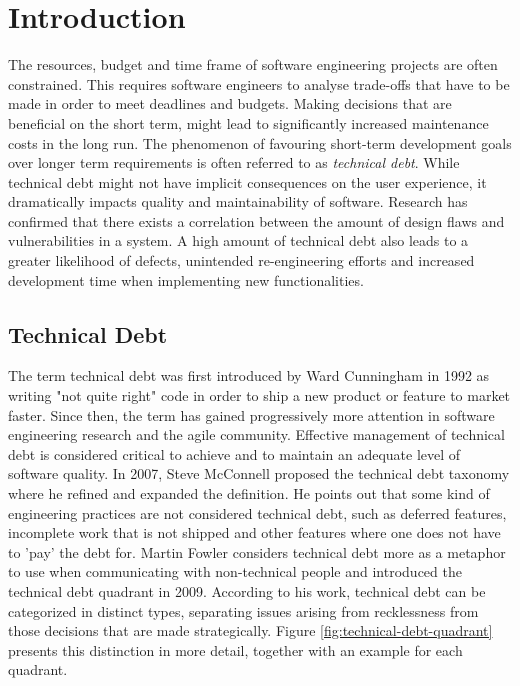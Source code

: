 \chapter{Introduction}


The resources, budget and time frame of software engineering projects are often constrained\cite{guo2011tracking}.
This requires software engineers to analyse trade-offs that have to be made in order to meet deadlines and budgets.
Making decisions that are beneficial on the short term, might lead to significantly increased maintenance costs in the long run.
The phenomenon of favouring short-term development goals over longer term requirements is often referred to as \emph{technical debt}.
While technical debt might not have implicit consequences on the user experience, it dramatically impacts quality and maintainability of software.
Research has confirmed that there exists a correlation between the amount of design flaws and vulnerabilities in a system\cite{nord2016debtvulnerabilities}.
A high amount of technical debt also leads to a greater likelihood of defects, unintended re-engineering efforts\cite{li2014empirical} and increased development time when implementing new functionalities.

\section{Technical Debt}
The term technical debt was first introduced by Ward Cunningham in 1992 as writing "not quite right" code in order to ship a new product or feature to market faster\cite{cunningham1993wycash}.
Since then, the term has gained progressively more attention in software engineering research and the agile community.
Effective management of technical debt is considered critical to achieve and to maintain an adequate level of software quality.
In 2007, Steve McConnell proposed the technical debt taxonomy where he refined and expanded the definition\cite{mcconnell2007debt}.
He points out that some kind of engineering practices are not considered technical debt, such as deferred features, incomplete work that is not shipped and other features where one does not have to 'pay' the debt for.
Martin Fowler considers technical debt more as a metaphor to use when communicating with non-technical people and introduced the technical debt quadrant in 2009\cite{technicaldebtquadrant}.
According to his work, technical debt can be categorized in distinct types, separating issues arising from recklessness from those decisions that are made strategically. 
Figure \ref{fig:technical-debt-quadrant} presents this distinction in more detail, together with an example for each quadrant.\\

